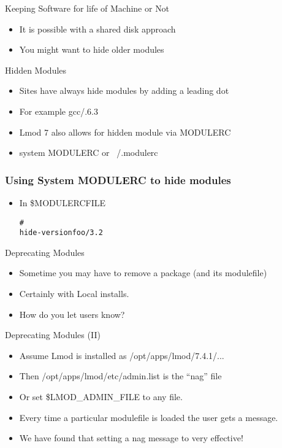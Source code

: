 \documentclass[dvipsnames,aspectratio=169]{beamer}
\begin{document}
\begin{frame}{Keeping Software for life of Machine or Not}
  \begin{itemize}
    \item It is possible with a shared disk approach
    \item You might want to hide older modules
  \end{itemize}
\end{frame}

\begin{frame}{Hidden Modules}
  \begin{itemize}
    \item Sites have always hide modules by adding a leading dot
    \item For example gcc/.6.3
    \item Lmod 7 also allows for hidden module via MODULERC
    \item system MODULERC or ~/.modulerc
  \end{itemize}
\end{frame}

\begin{frame}[fragile]
    \frametitle{Using System MODULERC to hide modules}
  \begin{itemize}
    \item In \$MODULERCFILE
  {\small
    \begin{alltt}
        #%Module
        hide-version foo/3.2
    \end{alltt}
}
  \end{itemize}
\end{frame}

\begin{frame}{Deprecating Modules}
  \begin{itemize}
    \item Sometime you may have to remove a package (and its
      modulefile)
    \item Certainly with Local installs.
    \item How do you let users know?
  \end{itemize}
\end{frame}

\begin{frame}{Deprecating Modules (II)}
  \begin{itemize}
    \item Assume Lmod is installed as /opt/apps/lmod/7.4.1/...
    \item Then /opt/apps/lmod/etc/admin.list is the ``nag'' file
    \item Or set \$LMOD\_ADMIN\_FILE to any file.
    \item Every time a particular modulefile is loaded the user gets a
      message.
    \item We have found that setting a nag message to very effective!
  \end{itemize}
\end{frame}
\end{document}
